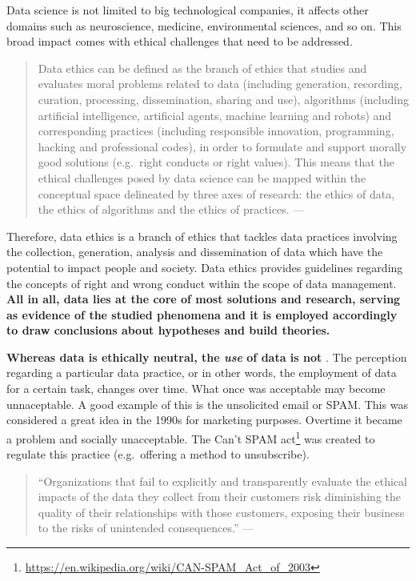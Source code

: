\documentclass[
  12pt,
]{book}
\DeclareRobustCommand{\href}[2]{#2\footnote{\url{#1}}}
\begin{document}
Data science is not limited to big technological companies, it affects other domains such as neuroscience, medicine, environmental sciences, and so on. This broad impact comes with ethical challenges that need to be addressed.

\begin{quote}
Data ethics can be defined as the branch of ethics that studies and evaluates moral problems related to data (including generation, recording, curation, processing, dissemination, sharing and use), algorithms (including artificial intelligence, artificial agents, machine learning and robots) and corresponding practices (including responsible innovation, programming, hacking and professional codes), in order to formulate and support morally good solutions (e.g.~right conducts or right values). This means that the ethical challenges posed by data science can be mapped within the conceptual space delineated by three axes of research: the ethics of data, the ethics of algorithms and the ethics of practices. --- \citep{luciano2016data}
\end{quote}

Therefore, data ethics is a branch of ethics that tackles data practices involving the collection, generation, analysis and dissemination of data which have the potential to impact people and society. Data ethics provides guidelines regarding the concepts of right and wrong conduct within the scope of data management. \textbf{All in all, data lies at the core of most solutions and research, serving as evidence of the studied phenomena and it is employed accordingly to draw conclusions about hypotheses and build theories.}

\textbf{Whereas data is ethically neutral, the \emph{use} of data is not} \citep{davis2012ethics}. The perception regarding a particular data practice, or in other words, the employment of data for a certain task, changes over time. What once was acceptable may become unnaceptable. A good example of this is the unsolicited email or SPAM. This was considered a great idea in the 1990s for marketing purposes. Overtime it became a problem and socially unacceptable. The \href{https://en.wikipedia.org/wiki/CAN-SPAM_Act_of_2003}{Can't SPAM act} was created to regulate this practice (e.g.~offering a method to unsubscribe).

\begin{quote}
``Organizations that fail to explicitly and transparently evaluate the ethical impacts of the data they collect from their customers risk diminishing the quality of their relationships with those customers, exposing their business to the risks of unintended consequences.'' --- \citep{davis2012ethics}
\end{quote}
\end{document}
